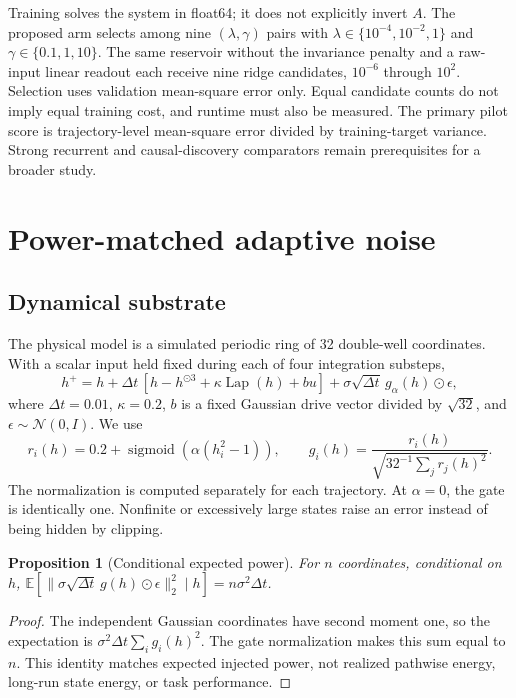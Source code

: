 \documentclass[10pt]{article}
\newtheorem{proposition}{Proposition}
\newcommand{\E}{\mathbb{E}}
\begin{document}
Training solves the system in float64; it does not explicitly invert $A$. The proposed arm selects among nine $(\lambda,\gamma)$ pairs with $\lambda\in\{10^{-4},10^{-2},1\}$ and $\gamma\in\{0.1,1,10\}$. The same reservoir without the invariance penalty and a raw-input linear readout each receive nine ridge candidates, $10^{-6}$ through $10^2$. Selection uses validation mean-square error only. Equal candidate counts do not imply equal training cost, and runtime must also be measured. The primary pilot score is trajectory-level mean-square error divided by training-target variance. Strong recurrent and causal-discovery comparators remain prerequisites for a broader study.

\section{Power-matched adaptive noise}
\subsection{Dynamical substrate}
The physical model is a simulated periodic ring of 32 double-well coordinates. With a scalar input held fixed during each of four integration substeps,
\begin{equation}
 h^+=h+\Delta t\,[h-h^{\odot3}+\kappa\operatorname{Lap}(h)+bu]
       +\sigma\sqrt{\Delta t}\,g_\alpha(h)\odot\epsilon,
\end{equation}
where $\Delta t=0.01$, $\kappa=0.2$, $b$ is a fixed Gaussian drive vector divided by $\sqrt{32}$, and $\epsilon\sim\mathcal N(0,I)$. We use
\begin{equation}
 r_i(h)=0.2+\operatorname{sigmoid}(\alpha(h_i^2-1)),\qquad
 g_i(h)=\frac{r_i(h)}{\sqrt{32^{-1}\sum_jr_j(h)^2}}.
\end{equation}
The normalization is computed separately for each trajectory. At $\alpha=0$, the gate is identically one. Nonfinite or excessively large states raise an error instead of being hidden by clipping.

\begin{proposition}[Conditional expected power]
For $n$ coordinates, conditional on $h$,
$\E[\|\sigma\sqrt{\Delta t}\,g(h)\odot\epsilon\|_2^2\mid h]=n\sigma^2\Delta t$.
\end{proposition}
\begin{proof}
The independent Gaussian coordinates have second moment one, so the expectation is $\sigma^2\Delta t\sum_i g_i(h)^2$. The gate normalization makes this sum equal to $n$. This identity matches expected injected power, not realized pathwise energy, long-run state energy, or task performance.
\end{proof}
\end{document}
